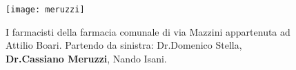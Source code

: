  \begin{figure}[htb]
    \centering
    \texttt{[image: meruzzi]}
    \caption[Farmacisti della farmacia comunale in via Mazzini]{I farmacisti della farmacia comunale  di via Mazzini appartenuta ad Attilio Boari. Partendo da sinistra: Dr.\:Domenico Stella, \textbf{Dr.\:Cassiano Meruzzi}, Nando Isani.\label{fig:meruzzi}}
\end{figure}










































%
